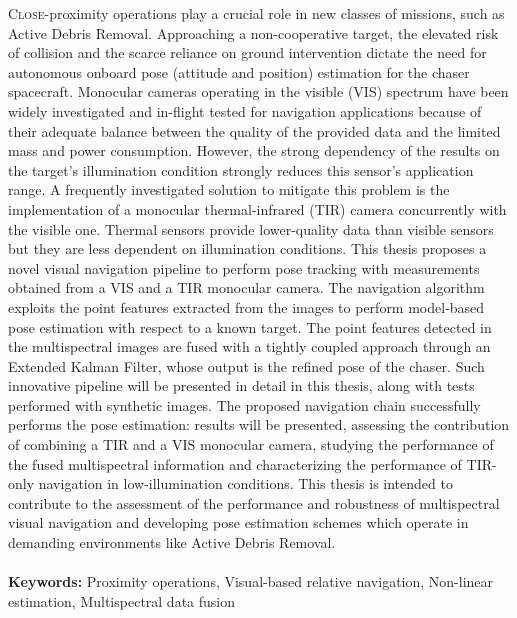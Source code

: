 \lettrine{C}{lose}-proximity operations play a crucial role in new classes of missions, such as Active Debris Removal. Approaching a non-cooperative target, the elevated risk of collision and the scarce reliance on ground intervention dictate the need for autonomous onboard pose (attitude and position) estimation for the chaser spacecraft. Monocular cameras operating in the visible (VIS) spectrum have been widely investigated and in-flight tested for navigation applications because of their adequate balance between the quality of the provided data and the limited mass and power consumption. However, the strong dependency of the results on the target’s illumination condition strongly reduces this sensor’s application range. A frequently investigated solution to mitigate this problem is the implementation of a monocular thermal-infrared (TIR) camera concurrently with the visible one. Thermal sensors provide lower-quality data than visible sensors but they are less dependent on illumination conditions.
This thesis proposes a novel visual navigation pipeline to perform pose tracking with measurements obtained from a VIS and a TIR monocular camera. The navigation algorithm exploits the point features extracted from the images to perform model-based pose estimation with respect to a known target. The point features detected in the multispectral images are fused with a tightly coupled approach through an Extended Kalman Filter, whose output is the refined pose of the chaser. Such innovative pipeline will be presented in detail in this thesis, along with tests performed with synthetic images.
The proposed navigation chain successfully performs the pose estimation: results will be presented, assessing the contribution of combining a TIR and a VIS monocular camera, studying the performance of the fused multispectral information and characterizing the performance of TIR-only navigation in low-illumination conditions.  This thesis is intended to contribute to the assessment of the performance and robustness of multispectral visual navigation and developing pose estimation schemes which operate in demanding environments like Active Debris Removal.
\\ \mbox{}\\ \noindent
\textbf{Keywords:} Proximity operations, Visual-based relative navigation, Non-linear estimation, Multispectral data fusion

